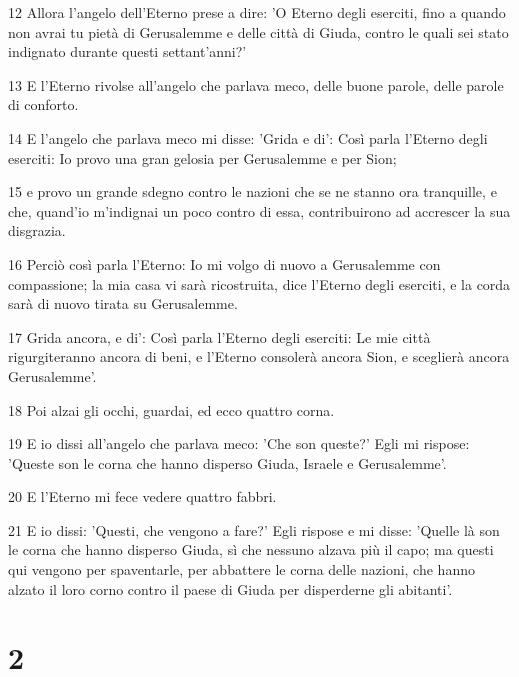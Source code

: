 \par 12 Allora l'angelo dell'Eterno prese a dire: 'O Eterno degli eserciti, fino a quando non avrai tu pietà di Gerusalemme e delle città di Giuda, contro le quali sei stato indignato durante questi settant'anni?'
\par 13 E l'Eterno rivolse all'angelo che parlava meco, delle buone parole, delle parole di conforto.
\par 14 E l'angelo che parlava meco mi disse: 'Grida e di': Così parla l'Eterno degli eserciti: Io provo una gran gelosia per Gerusalemme e per Sion;
\par 15 e provo un grande sdegno contro le nazioni che se ne stanno ora tranquille, e che, quand'io m'indignai un poco contro di essa, contribuirono ad accrescer la sua disgrazia.
\par 16 Perciò così parla l'Eterno: Io mi volgo di nuovo a Gerusalemme con compassione; la mia casa vi sarà ricostruita, dice l'Eterno degli eserciti, e la corda sarà di nuovo tirata su Gerusalemme.
\par 17 Grida ancora, e di': Così parla l'Eterno degli eserciti: Le mie città rigurgiteranno ancora di beni, e l'Eterno consolerà ancora Sion, e sceglierà ancora Gerusalemme'.
\par 18 Poi alzai gli occhi, guardai, ed ecco quattro corna.
\par 19 E io dissi all'angelo che parlava meco: 'Che son queste?' Egli mi rispose: 'Queste son le corna che hanno disperso Giuda, Israele e Gerusalemme'.
\par 20 E l'Eterno mi fece vedere quattro fabbri.
\par 21 E io dissi: 'Questi, che vengono a fare?' Egli rispose e mi disse: 'Quelle là son le corna che hanno disperso Giuda, sì che nessuno alzava più il capo; ma questi qui vengono per spaventarle, per abbattere le corna delle nazioni, che hanno alzato il loro corno contro il paese di Giuda per disperderne gli abitanti'.

\chapter{2}

